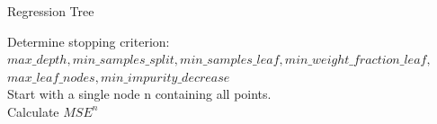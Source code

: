 \documentclass[../thesis.tex]{subfiles}
\begin{document}
\begin{algorithm}
\caption{Regression Tree}\label{Alg:Regression}
Determine stopping criterion:\\ $max\_depth, min\_samples\_split, min\_samples\_leaf, min\_weight\_fraction\_leaf,$\\$ max\_leaf\_nodes, min\_impurity\_decrease$\\
Start with a single node n containing all points. \\
Calculate $MSE^{n}$\\
\end{algorithm}


\end{document}
